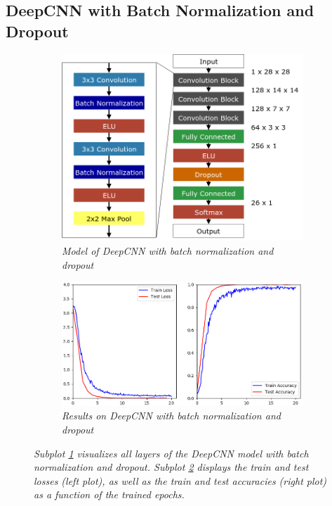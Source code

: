\documentclass[a4paper]{article}
\begin{document}
\subsection{DeepCNN with Batch Normalization and Dropout}\label{sec:deepCNN_regularized}
\begin{figure}
    \centering
    \hspace{-1cm}
    \begin{subfigure}[b]{0.4\textwidth}
        \includegraphics[height=0.25\paperwidth]{graphics/nets/CNN13_with_BN}
        \caption{\textit{Model of DeepCNN with batch normalization and dropout}}
        \label{fig:deepCNN_regularized_model}
    \end{subfigure}
    \begin{subfigure}[b]{0.5\textwidth}
        \includegraphics[height=0.25\paperwidth]{graphics/nets/CNN13_with_BN_Results}
        \caption{\textit{Results on DeepCNN with batch normalization and dropout}}
        \label{fig:deepCNN_regularized_results}
    \end{subfigure}
    \caption{\textit{Subplot \ref{fig:deepCNN_regularized_model} visualizes all layers of the DeepCNN model with batch normalization and dropout. Subplot \ref{fig:deepCNN_regularized_results} displays the train and test losses (left plot), as well as the train and test accuracies (right plot) as a function of the trained epochs.}}\label{fig:deepCNN_regularized}
\end{figure}
\end{document}

